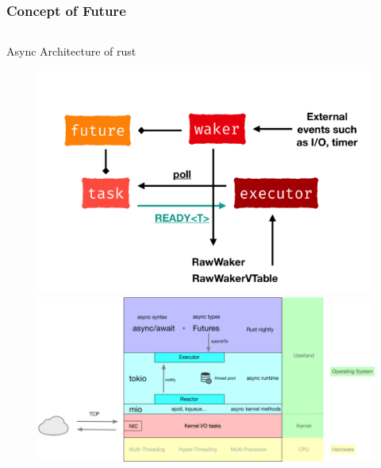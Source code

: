 \begin{frame}[fragile]
    \frametitle{Concept of Future}
    \begin{columns}
        \begin{column}{.4\textwidth}
            \centering
             Async Architecture of rust
            \begin{figure}
                \includegraphics[width=1.\linewidth]{figs/rust-async-simple-arch.png}
                \includegraphics[width=.8\linewidth]{figs/rust-async-arch.png}
            \end{figure}
        \end{column}
        

\end{columns}
\end{frame}
